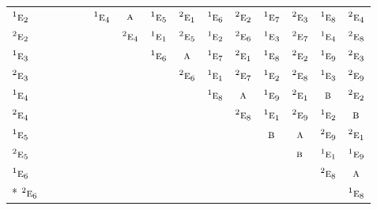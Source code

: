 \documentclass[10pt,a4paper]{article}
\numberwithin{equation}{section}
\newcommand{\irr}[1]{\text{\normalfont\scshape #1}}
\newcommand{\conjpair}[1]{{}^{#1}}
\begin{document}
{\begin{longtable}{@{}lcccccccccccccc@{}}
$\conjpair{1}\irr{e}_{2}$ &  &  &  &  & $\conjpair{1}\irr{e}_{4}$ & $\irr{a}$ & $\conjpair{1}\irr{e}_{5}$ & $\conjpair{2}\irr{e}_{1}$ & $\conjpair{1}\irr{e}_{6}$ & $\conjpair{2}\irr{e}_{2}$ & $\conjpair{1}\irr{e}_{7}$ & $\conjpair{2}\irr{e}_{3}$ & $\conjpair{1}\irr{e}_{8}$ & $\conjpair{2}\irr{e}_{4}$\\
$\conjpair{2}\irr{e}_{2}$ &  &  &  &  &  & $\conjpair{2}\irr{e}_{4}$ & $\conjpair{1}\irr{e}_{1}$ & $\conjpair{2}\irr{e}_{5}$ & $\conjpair{1}\irr{e}_{2}$ & $\conjpair{2}\irr{e}_{6}$ & $\conjpair{1}\irr{e}_{3}$ & $\conjpair{2}\irr{e}_{7}$ & $\conjpair{1}\irr{e}_{4}$ & $\conjpair{2}\irr{e}_{8}$\\
$\conjpair{1}\irr{e}_{3}$ &  &  &  &  &  &  & $\conjpair{1}\irr{e}_{6}$ & $\irr{a}$ & $\conjpair{1}\irr{e}_{7}$ & $\conjpair{2}\irr{e}_{1}$ & $\conjpair{1}\irr{e}_{8}$ & $\conjpair{2}\irr{e}_{2}$ & $\conjpair{1}\irr{e}_{9}$ & $\conjpair{2}\irr{e}_{3}$\\
$\conjpair{2}\irr{e}_{3}$ &  &  &  &  &  &  &  & $\conjpair{2}\irr{e}_{6}$ & $\conjpair{1}\irr{e}_{1}$ & $\conjpair{2}\irr{e}_{7}$ & $\conjpair{1}\irr{e}_{2}$ & $\conjpair{2}\irr{e}_{8}$ & $\conjpair{1}\irr{e}_{3}$ & $\conjpair{2}\irr{e}_{9}$\\
$\conjpair{1}\irr{e}_{4}$ &  &  &  &  &  &  &  &  & $\conjpair{1}\irr{e}_{8}$ & $\irr{a}$ & $\conjpair{1}\irr{e}_{9}$ & $\conjpair{2}\irr{e}_{1}$ & $\irr{b}$ & $\conjpair{2}\irr{e}_{2}$\\
$\conjpair{2}\irr{e}_{4}$ &  &  &  &  &  &  &  &  &  & $\conjpair{2}\irr{e}_{8}$ & $\conjpair{1}\irr{e}_{1}$ & $\conjpair{2}\irr{e}_{9}$ & $\conjpair{1}\irr{e}_{2}$ & $\irr{b}$\\
$\conjpair{1}\irr{e}_{5}$ &  &  &  &  &  &  &  &  &  &  & $\irr{b}$ & $\irr{a}$ & $\conjpair{2}\irr{e}_{9}$ & $\conjpair{2}\irr{e}_{1}$\\
$\conjpair{2}\irr{e}_{5}$ &  &  &  &  &  &  &  &  &  &  &  & $\irr{b}$ & $\conjpair{1}\irr{e}_{1}$ & $\conjpair{1}\irr{e}_{9}$\\
$\conjpair{1}\irr{e}_{6}$ &  &  &  &  &  &  &  &  &  &  &  &  & $\conjpair{2}\irr{e}_{8}$ & $\irr{a}$\\*
$\conjpair{2}\irr{e}_{6}$ &  &  &  &  &  &  &  &  &  &  &  &  &  & $\conjpair{1}\irr{e}_{8}$\\
\bottomrule\end{longtable}}
\end{document}
